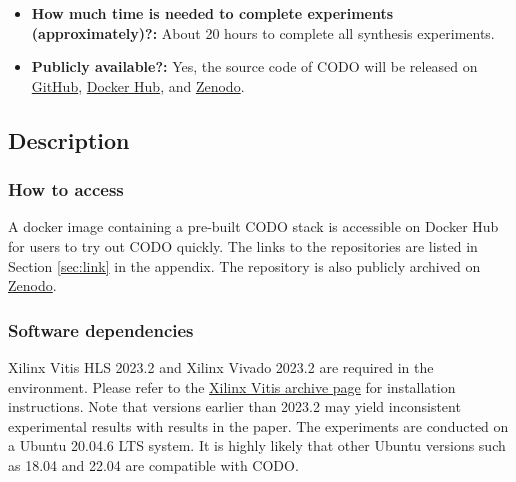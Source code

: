\documentclass[conference]{IEEEtran}
\begin{document}
{\begin{itemize}
  \item {\bf How much time is needed to complete experiments (approximately)?: } About 20 hours to complete all synthesis experiments.
  \item {\bf Publicly available?: } Yes, the source code of CODO will be released on \href{https://github.com/sjtu-zhao-lab/codo-artifact}{GitHub}, \href{https://hub.docker.com/r/xzz11/codo_ae_image}{Docker Hub}, and \href{https://doi.org/10.5281/zenodo.19425920}{Zenodo}.
\end{itemize}
}

\subsection{Description}

\subsubsection{How to access} 
A docker image containing a pre-built CODO stack is accessible on Docker Hub for users to try out CODO quickly. The links to the repositories are listed in Section \ref{sec:link} in the appendix. The repository is also publicly archived on \href{https://doi.org/10.5281/zenodo.19425920}{Zenodo}.


\subsubsection{Software dependencies} 
Xilinx Vitis HLS 2023.2 and Xilinx Vivado 2023.2 are required in the environment. Please refer to the \href{https://www.xilinx.com/support/download/index.html/content/xilinx/en/downloadNav/vitis/archive-vitis.html}{Xilinx Vitis archive page} for installation instructions.
Note that versions earlier than 2023.2 may yield inconsistent experimental results with results in the paper. The experiments are conducted on a Ubuntu 20.04.6 LTS system. It is highly likely that other Ubuntu versions such as 18.04 and 22.04 are compatible with CODO.
\end{document}
